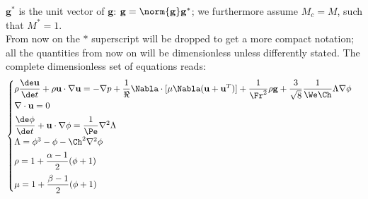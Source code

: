 $\mathbf g^*$ is the unit vector of $\mathbf g$: $\mathbf g=\norm{\mathbf g} \mathbf g^*$; we furthermore assume $M_c=M$, such that $M^*=1$.\\
From now on the $*$ superscript will be dropped to get a more compact notation; all the quantities from now on will be dimensionless unless differently stated.
The complete dimensionless set of equations reads:
\begin{equation}
\begin{cases}
\rho \dfrac{\de \mathbf u}{\de t} +\rho \mathbf u \cdot \nabla \mathbf u =-\nabla p +\dfrac{1}{\Re} \Nabla\cdot[\mu\Nabla( \mathbf u+\mathbf u^{T})]+\dfrac{1}{\Fr^2}\rho\mathbf g+\dfrac{3}{\sqrt8}\dfrac{1}{\We\Ch}\Lambda \nabla\phi\\[1ex]
\nabla\cdot \mathbf u =0\\[1ex]
\dfrac{\de \phi}{\de t} +\mathbf u \cdot \nabla \phi=\dfrac{1}{\Pe}\nabla^2 \Lambda \\[1ex]
\Lambda=\phi^{3}- \phi-\Ch^2\nabla^{2} \phi\\[1ex]
\rho=1+\dfrac{\alpha-1}{2}(\phi+1)\\[2ex]
\mu=1+\dfrac{\beta-1}{2}(\phi+1)\\
\end{cases}
\end{equation}















